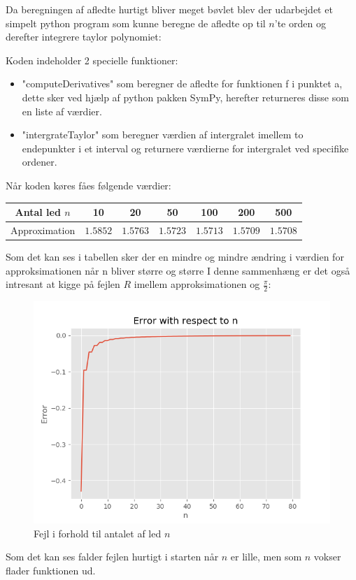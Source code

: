 Da beregningen af afledte hurtigt bliver meget bøvlet blev der udarbejdet et simpelt python program
som kunne beregne de afledte op til $n$'te orden og derefter integrere taylor polynomiet:

Koden indeholder 2 specielle funktioner:
\begin{itemize}
  \item "computeDerivatives" som beregner de afledte for funktionen f 
  i punktet a, dette sker ved hjælp af python pakken SymPy, herefter returneres disse som en liste af værdier.  
  \item "intergrateTaylor" som beregner værdien af intergralet imellem to endepunkter i et interval
  og returnere værdierne for intergralet ved specifike ordener. 
\end{itemize} 
Når koden køres fåes følgende værdier:
\begin{center}
  \begin{tabular}{ |c|c|c|c|c|c|c| }
    \hline
      Antal led $n$ & 10 & 20 & 50 & 100 & 200 & 500 \\
    \hline
      Approximation & $1.5852$ & $1.5763$ & $1.5723$ & $1.5713$ & $1.5709$ & $1.5708$ \\
    \hline
  \end{tabular}
\end{center}
Som det kan ses i tabellen sker der en mindre og mindre ændring i værdien for approksimationen når n bliver større og større
I denne sammenhæng er det også intresant at kigge på fejlen $R$ imellem approksimationen og $\frac{\pi}{2}$:
\begin{figure}[H]
  \centering
  \includegraphics[width=\textwidth]{fig/img/ErrorWithRespectToN.png}
  \caption{Fejl i forhold til antalet af led $n$}
  \label{fig:FejlIForholdTilN}
\end{figure}
Som det kan ses falder fejlen hurtigt i starten når $n$ er lille, men som $n$ vokser flader funktionen ud.